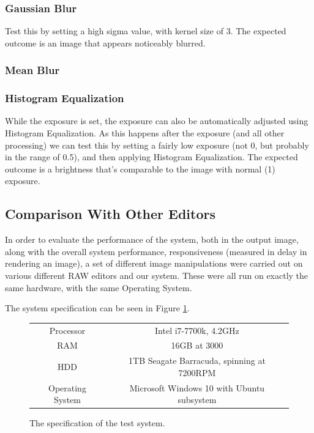 \documentclass[10pt,a4paper]{article}
\begin{document}
\subsubsection{Gaussian Blur}
Test this by setting a high sigma value, with kernel size of 3. The expected outcome is an image that appears noticeably blurred.
\subsubsection{Mean Blur}

\subsubsection{Histogram Equalization}
While the exposure is set, the exposure can also be automatically adjusted using Histogram Equalization. As this happens after the exposure (and all other processing)
we can test this by setting a fairly low exposure (not 0, but probably in the range of 0.5), and then applying Histogram Equalization. The expected outcome is a brightness
that's comparable to the image with normal (1) exposure.


\subsection{Comparison With Other Editors}
In order to evaluate the performance of the system, both in the output image, along with the overall system performance,
responsiveness (measured in delay in rendering an image), a set of different image manipulations were carried out on various
different RAW editors and our system. These were all run on exactly the same hardware, with the same Operating System.

The system specification can be seen in Figure \ref{SystemSpecs}.

\begin{figure}\label{SystemSpecs}
    \centering
    \begin{tabular}{| c | c |}
        \hline
        Processor & Intel i7-7700k, 4.2GHz\\
        RAM & 16GB at 3000\\
        HDD & 1TB Seagate Barracuda, spinning at 7200RPM\\
        Operating System & Microsoft Windows 10 with Ubuntu subsystem\\
        \hline
    \end{tabular}
    \caption{The specification of the test system.}
\end{figure}
\end{document}
